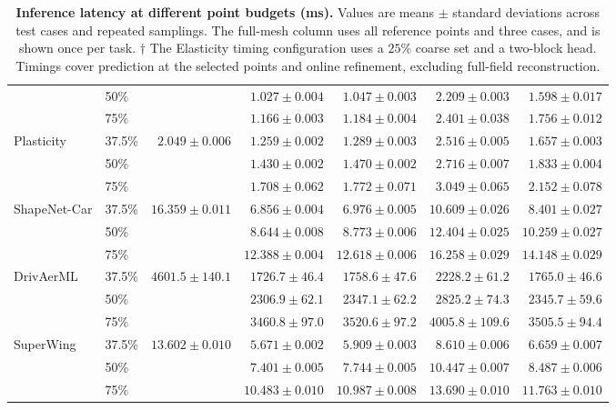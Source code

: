 \documentclass{article}
\begin{document}
\begin{table}[!ht]
\begin{tabular}{llrrrrr}
 & 50\% &  & $1.027\!\pm\!0.004$ & $1.047\!\pm\!0.003$ & $2.209\!\pm\!0.003$ & $1.598\!\pm\!0.017$ \\
 & 75\% &  & $1.166\!\pm\!0.003$ & $1.184\!\pm\!0.004$ & $2.401\!\pm\!0.038$ & $1.756\!\pm\!0.012$ \\
\addlinespace[2pt]
Plasticity & 37.5\% & $2.049\!\pm\!0.006$ & $1.259\!\pm\!0.002$ & $1.289\!\pm\!0.003$ & $2.516\!\pm\!0.005$ & $1.657\!\pm\!0.003$ \\
 & 50\% &  & $1.430\!\pm\!0.002$ & $1.470\!\pm\!0.002$ & $2.716\!\pm\!0.007$ & $1.833\!\pm\!0.004$ \\
 & 75\% &  & $1.708\!\pm\!0.062$ & $1.772\!\pm\!0.071$ & $3.049\!\pm\!0.065$ & $2.152\!\pm\!0.078$ \\
\addlinespace[2pt]
ShapeNet-Car & 37.5\% & $16.359\!\pm\!0.011$ & $6.856\!\pm\!0.004$ & $6.976\!\pm\!0.005$ & $10.609\!\pm\!0.026$ & $8.401\!\pm\!0.027$ \\
 & 50\% &  & $8.644\!\pm\!0.008$ & $8.773\!\pm\!0.006$ & $12.404\!\pm\!0.025$ & $10.259\!\pm\!0.027$ \\
 & 75\% &  & $12.388\!\pm\!0.004$ & $12.618\!\pm\!0.006$ & $16.258\!\pm\!0.029$ & $14.148\!\pm\!0.029$ \\
\addlinespace[2pt]
DrivAerML & 37.5\% & $4601.5\!\pm\!140.1$ & $1726.7\!\pm\!46.4$ & $1758.6\!\pm\!47.6$ & $2228.2\!\pm\!61.2$ & $1765.0\!\pm\!46.6$ \\
 & 50\% &  & $2306.9\!\pm\!62.1$ & $2347.1\!\pm\!62.2$ & $2825.2\!\pm\!74.3$ & $2345.7\!\pm\!59.6$ \\
 & 75\% &  & $3460.8\!\pm\!97.0$ & $3520.6\!\pm\!97.2$ & $4005.8\!\pm\!109.6$ & $3505.5\!\pm\!94.4$ \\
\addlinespace[2pt]
SuperWing & 37.5\% & $13.602\!\pm\!0.010$ & $5.671\!\pm\!0.002$ & $5.909\!\pm\!0.003$ & $8.610\!\pm\!0.006$ & $6.659\!\pm\!0.007$ \\
 & 50\% &  & $7.401\!\pm\!0.005$ & $7.744\!\pm\!0.005$ & $10.447\!\pm\!0.007$ & $8.487\!\pm\!0.006$ \\
 & 75\% &  & $10.483\!\pm\!0.010$ & $10.987\!\pm\!0.008$ & $13.690\!\pm\!0.010$ & $11.763\!\pm\!0.010$ \\
\bottomrule
\end{tabular}
\endgroup
\caption{\textbf{Inference latency at different point budgets (ms).}
Values are means $\pm$ standard deviations across test cases and repeated samplings.
The full-mesh column uses all reference points and three cases, and is shown once per task.
$\dagger$ The Elasticity timing configuration uses a $25\%$ coarse set and a two-block head.
Timings cover prediction at the selected points and online refinement, excluding full-field reconstruction.}
\label{tab:inference_time_sampled}
\end{table}
\end{document}
